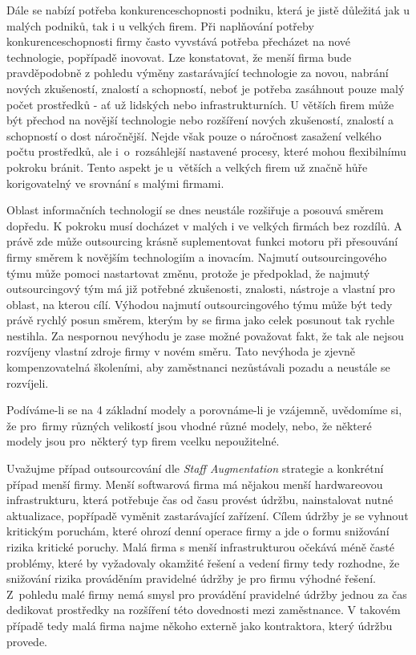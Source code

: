 \documentclass[a4paper,12pt]{article}
\begin{document}
    Dále se nabízí potřeba konkurenceschopnosti podniku, která je jistě důležitá jak u malých podniků, tak i u velkých firem. Při naplňování potřeby konkurenceschopnosti firmy často vyvstává potřeba přecházet na nové technologie, popřípadě inovovat. Lze konstatovat, že menší firma bude pravděpodobně  z pohledu výměny zastarávající technologie za novou, nabrání nových zkušeností, znalostí a schopností, neboť je potřeba zasáhnout pouze malý počet prostředků - ať už lidských nebo infrastrukturních. U větších firem může být přechod na novější technologie nebo rozšíření nových zkušeností, znalostí a schopností o dost náročnější. Nejde však pouze o náročnost zasažení velkého počtu prostředků, ale i~o~rozsáhlejší nastavené procesy, které mohou flexibilnímu pokroku bránit. Tento aspekt je u~větších a velkých firem už značně hůře korigovatelný ve srovnání s malými firmami.

    Oblast informačních technologií se dnes neustále rozšiřuje a posouvá směrem dopředu. K pokroku musí docházet v malých i ve velkých firmách bez rozdílů. A právě zde může outsourcing krásně suplementovat funkci motoru při přesouvání firmy směrem k novějším technologiím a inovacím. Najmutí outsourcingového týmu může pomoci nastartovat změnu, protože je předpoklad, že najmutý outsourcingový tým má již potřebné zkušenosti, znalosti, nástroje a vlastní  pro oblast, na kterou cílí. Výhodou najmutí outsourcingového týmu může být tedy právě rychlý posun směrem, kterým by se firma jako celek posunout tak rychle nestihla. Za nespornou nevýhodu je zase možné považovat fakt, že tak ale nejsou rozvíjeny vlastní zdroje firmy v novém směru. Tato nevýhoda je zjevně kompenzovatelná školeními, aby zaměstnanci nezůstávali pozadu a neustále se rozvíjeli.

    Podíváme-li se na 4 základní modely a porovnáme-li je vzájemně, uvědomíme si, že pro~firmy různých velikostí jsou vhodné různé modely, nebo, že některé modely jsou pro~některý typ firem vcelku nepoužitelné. 

    Uvažujme případ outsourcování dle \textit{Staff Augmentation} strategie a konkrétní případ menší firmy. Menší softwarová firma má nějakou menší hardwareovou infrastrukturu, která potřebuje čas od času provést údržbu, nainstalovat nutné aktualizace, popřípadě vyměnit zastarávající zařízení. Cílem údržby je se vyhnout kritickým poruchám, které ohrozí denní operace firmy a jde o formu snižování rizika kritické poruchy. Malá firma s menší infrastrukturou očekává méně časté problémy, které by vyžadovaly okamžité řešení a vedení firmy tedy rozhodne, že snižování rizika prováděním pravidelné údržby je pro firmu výhodné řešení. Z~pohledu malé firmy nemá smysl pro provádění pravidelné údržby jednou za čas dedikovat prostředky na rozšíření této dovednosti mezi zaměstnance. V takovém případě tedy malá firma najme někoho externě jako kontraktora, který údržbu provede. 
\end{document}
